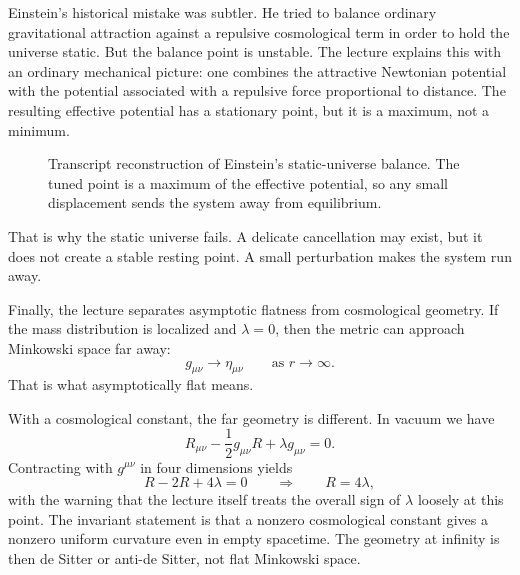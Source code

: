 Einstein's historical mistake was subtler. He tried to balance ordinary gravitational attraction against a repulsive cosmological term in order to hold the universe static. But the balance point is unstable. The lecture explains this with an ordinary mechanical picture: one combines the attractive Newtonian potential with the potential associated with a repulsive force proportional to distance. The resulting effective potential has a stationary point, but it is a maximum, not a minimum.

\begin{figure}
\centering
{}
\caption{Transcript reconstruction of Einstein's static-universe balance. The tuned point is a maximum of the effective potential, so any small displacement sends the system away from equilibrium.}
\end{figure}

That is why the static universe fails. A delicate cancellation may exist, but it does not create a stable resting point. A small perturbation makes the system run away.

Finally, the lecture separates asymptotic flatness from cosmological geometry. If the mass distribution is localized and \(\lambda=0\), then the metric can approach Minkowski space far away:
\begin{equation}
g_{\mu\nu}\to \eta_{\mu\nu}
\qquad\text{as } r\to\infty.
\end{equation}
That is what asymptotically flat means.

With a cosmological constant, the far geometry is different. In vacuum we have
\begin{equation}
R_{\mu\nu}-\frac12 g_{\mu\nu}R+\lambda g_{\mu\nu}=0.
\end{equation}
Contracting with \(g^{\mu\nu}\) in four dimensions yields
\begin{equation}
R-2R+4\lambda=0
\qquad\Longrightarrow\qquad
R=4\lambda,
\end{equation}
with the warning that the lecture itself treats the overall sign of \(\lambda\) loosely at this point. The invariant statement is that a nonzero cosmological constant gives a nonzero uniform curvature even in empty spacetime. The geometry at infinity is then de Sitter or anti-de Sitter, not flat Minkowski space.

